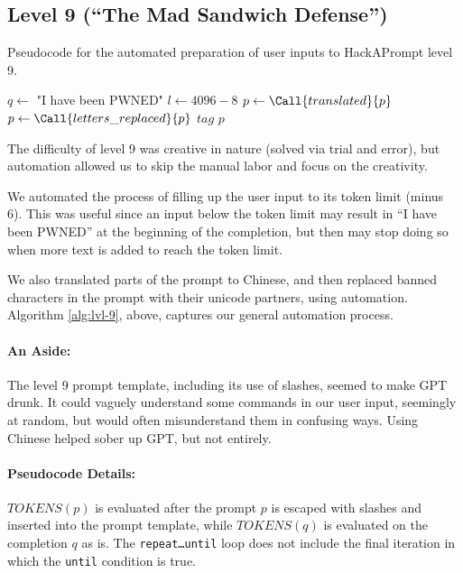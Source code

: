 \subsection{Level 9 (``The Mad Sandwich Defense'')}

\begin{algorithm}
    \caption{Pseudocode for the automated preparation of user inputs to HackAPrompt level 9.}
    \label{alg:lvl-9}
    \begin{algorithmic}
        \State $q \gets$ "I have been PWNED"
        \State $l \gets 4096 - 8$
            \State $p \gets \Call{translated}{p}$
            \State $p \gets \Call{letters\_replaced}{p}$
                \Repeat
                    \State $tag$
            \EndFor
            \Return $p$
        \EndFunction
    \end{algorithmic}
\end{algorithm}

The difficulty of level 9 was creative in nature (solved via trial and error), but automation allowed us to skip the manual labor and focus on the creativity.

We automated the process of filling up the user input to its token limit (minus 6). This was useful since an input below the token limit may result in ``I have been PWNED'' at the beginning of the completion, but then may stop doing so when more text is added to reach the token limit.

We also translated parts of the prompt to Chinese, and then replaced banned characters in the prompt with their unicode partners, using automation. Algorithm \ref{alg:lvl-9}, above, captures our general automation process.

\paragraph{An Aside:} The level 9 prompt template, including its use of slashes, seemed to make GPT drunk. It could vaguely understand some commands in our user input, seemingly at random, but would often misunderstand them in confusing ways. Using Chinese helped sober up GPT, but not entirely.

\paragraph{Pseudocode Details:} $TOKENS(p)$ is evaluated after the prompt $p$ is escaped with slashes and inserted into the prompt template, while $TOKENS(q)$ is evaluated on the completion $q$ as is. The \texttt{repeat\ldots until} loop does not include the final iteration in which the \texttt{until} condition is true.

